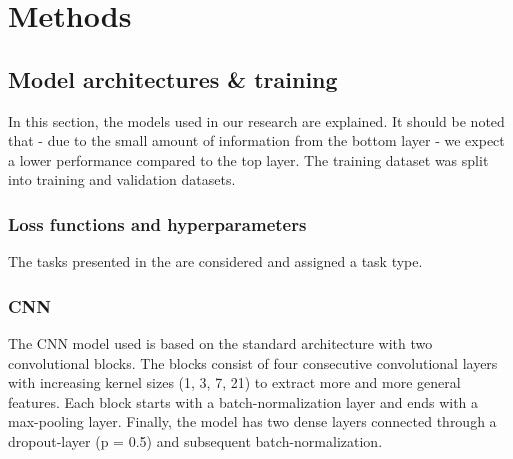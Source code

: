 
\chapter{Methods} %

\label{Chapter3} %







\section{Model architectures \& training}
In this section, the models used in our research are explained.
It should be noted that - due to the small amount of information from the bottom layer - we expect a lower performance compared to the top layer.
The training dataset was split into training and validation datasets.

\subsection{Loss functions and hyperparameters}
The tasks presented in the  are considered and assigned a task type.


\subsection{CNN}
The CNN model used is based on the standard architecture with two convolutional blocks. The blocks consist of four consecutive convolutional layers with increasing kernel sizes (1, 3, 7, 21) to extract more and more general features. Each block starts with a batch-normalization layer and ends with a max-pooling layer. Finally, the model has two dense layers connected through a dropout-layer (p = 0.5) and subsequent batch-normalization.

